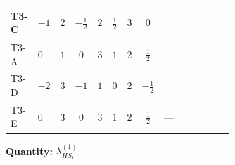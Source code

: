 \documentclass[8pt]{article}
\begin{document}
\begin{landscape}
\begin{longtable}{@{}llcccccc >{\raggedright\arraybackslash}p{0.21\linewidth} >{\raggedright\arraybackslash}p{0.21\linewidth} >{\raggedright\arraybackslash}p{0.21\linewidth}@{}}
\midrule
T3-C & $-1$ & $2$ & $-\frac{1}{2}$ & $2$ & $\frac{1}{2}$ & $3$ & $0$ & \scriptsize\adjustbox{max width=\linewidth}{$\begin{gathered} +4 {\lambda_{12}^{(1)}} {\lambda_{HS_2}^{(1)}}\end{gathered}$} & \scriptsize\adjustbox{max width=\linewidth}{$\begin{gathered} +6 {\lambda_1} {\lambda_{HS_1}^{(1)}}\end{gathered}$} & \scriptsize\adjustbox{max width=\linewidth}{$\begin{gathered} +4 {\lambda_{HS_1}^{(1)}}^2\end{gathered}$} \\
\midrule
T3-A & $0$ & $1$ & $0$ & $3$ & $1$ & $2$ & $\frac{1}{2}$ & \scriptsize\adjustbox{max width=\linewidth}{$\begin{gathered} +6 {\lambda_{12}^{(1)}} {\lambda_{HS_2}^{(1)}}\end{gathered}$} & \scriptsize\adjustbox{max width=\linewidth}{$\begin{gathered} +6 {\lambda_1} {\lambda_{HS_1}^{(1)}}\end{gathered}$} & \scriptsize\adjustbox{max width=\linewidth}{$\begin{gathered} +4 {\lambda_{HS_1}^{(1)}}^2\end{gathered}$} \\
\midrule
T3-D & $-2$ & $3$ & $-1$ & $1$ & $0$ & $2$ & $-\frac{1}{2}$ & \scriptsize\adjustbox{max width=\linewidth}{$\begin{gathered} +2 {\lambda_{12}^{(1)}} {\lambda_{HS_2}^{(1)}}\end{gathered}$} & \scriptsize\adjustbox{max width=\linewidth}{$\begin{gathered} +6 {\lambda_1} {\lambda_{HS_1}^{(1)}}\end{gathered}$} & \scriptsize\adjustbox{max width=\linewidth}{$\begin{gathered} +4 {\lambda_{HS_1}^{(1)}}^2\end{gathered}$} \\
\midrule
T3-E & $0$ & $3$ & $0$ & $3$ & $1$ & $2$ & $\frac{1}{2}$ & --- & \scriptsize\adjustbox{max width=\linewidth}{$\begin{gathered} +6 {\lambda_1} {\lambda_{HS_1}^{(1)}}\end{gathered}$} & \scriptsize\adjustbox{max width=\linewidth}{$\begin{gathered} +4 {\lambda_{HS_1}^{(1)}}^2\end{gathered}$} \\
\midrule
\bottomrule
\end{longtable}
\clearpage
\noindent\textbf{Quantity: }$\lambda_{HS_1}^{(1)}$\par\smallskip

\end{landscape}
\end{document}
